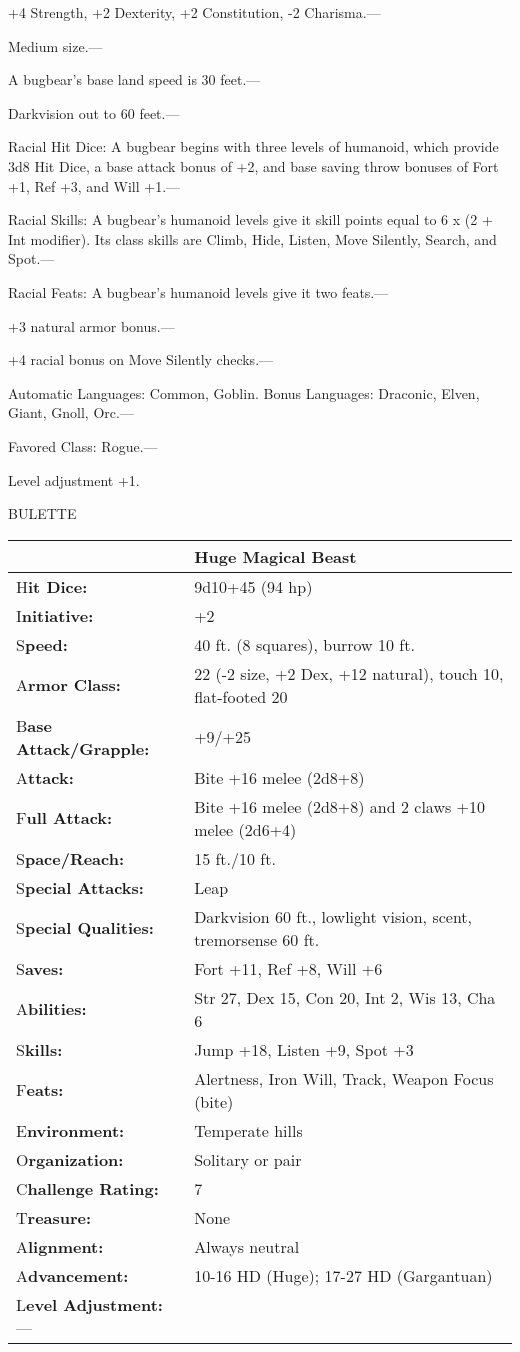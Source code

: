 \documentclass{article}
\begin{document}
\parindent=3pt
+4 Strength, +2 Dexterity, +2 Constitution, -2 Charisma.---

\parindent=0pt
Medium size.---

A bugbear's base land speed is 30 feet.---

Darkvision out to 60 feet.---

Racial Hit Dice: A bugbear begins with three levels of humanoid, which provide 
3d8 Hit Dice, a base attack bonus of +2, and base saving throw bonuses of Fort 
+1, Ref +3, and Will +1.---

Racial Skills: A bugbear's humanoid levels give it skill points equal to 6 x $ $(2 
+ Int modifier). Its class skills are Climb, Hide, Listen, Move Silently, Search, 
and Spot.---

Racial Feats: A bugbear's humanoid levels give it two feats.--- 

\parindent=3pt
+3 natural armor bonus.--- 

+4 racial bonus on Move Silently checks.---

Automatic Languages: Common, Goblin. Bonus Languages: Draconic, Elven, Giant, Gnoll, 
Orc.---

Favored Class: Rogue.---

Level adjustment +1.

\vspace{12pt}
\parindent=0pt
{\LARGE{}BULETTE}

\begin{tabular}{|>{\raggedright}p{91pt}|>{\raggedright}p{234pt}|}
\hline
  & Huge Magical Beast\tabularnewline
\hline
H\textbf{it Dice:} & 9d10+45 (94 hp)\tabularnewline
\hline
I\textbf{nitiative:} & +2\tabularnewline
\hline
S\textbf{peed:} & 40 ft. (8 squares), burrow 10 ft.\tabularnewline
\hline
A\textbf{rmor Class:} & 22 (-2 size, +2 Dex, +12 natural), touch 10, flat-footed 
20\tabularnewline
\hline
B\textbf{ase Attack/Grapple:} & +9/+25\tabularnewline
\hline
A\textbf{ttack:} & Bite +16 melee (2d8+8)\tabularnewline
\hline
F\textbf{ull Attack:} & Bite +16 melee (2d8+8) and 2 claws +10 melee (2d6+4)\tabularnewline
\hline
S\textbf{pace/Reach:} & 15 ft./10 ft.\tabularnewline
\hline
S\textbf{pecial Attacks:} & Leap\tabularnewline
\hline
S\textbf{pecial Qualities:} & Darkvision 60 ft., lowlight vision, scent, tremorsense 
60 ft.\tabularnewline
\hline
S\textbf{aves:} & Fort +11, Ref +8, Will +6\tabularnewline
\hline
A\textbf{bilities:} & Str 27, Dex 15, Con 20, Int 2, Wis 13, Cha 6\tabularnewline
\hline
S\textbf{kills:} & Jump +18, Listen +9, Spot +3\tabularnewline
\hline
F\textbf{eats:} & Alertness, Iron Will, Track, Weapon Focus (bite)\tabularnewline
\hline
E\textbf{nvironment:} & Temperate hills\tabularnewline
\hline
O\textbf{rganization:} & Solitary or pair\tabularnewline
\hline
C\textbf{hallenge Rating:} & 7\tabularnewline
\hline
T\textbf{reasure:} & None\tabularnewline
\hline
A\textbf{lignment:} & Always neutral\tabularnewline
\hline
A\textbf{dvancement:} & 10-16 HD (Huge); 17-27 HD (Gargantuan)\tabularnewline
\hline
L\textbf{evel Adjustment:}--- & \tabularnewline
\hline
\end{tabular}
\end{document}
